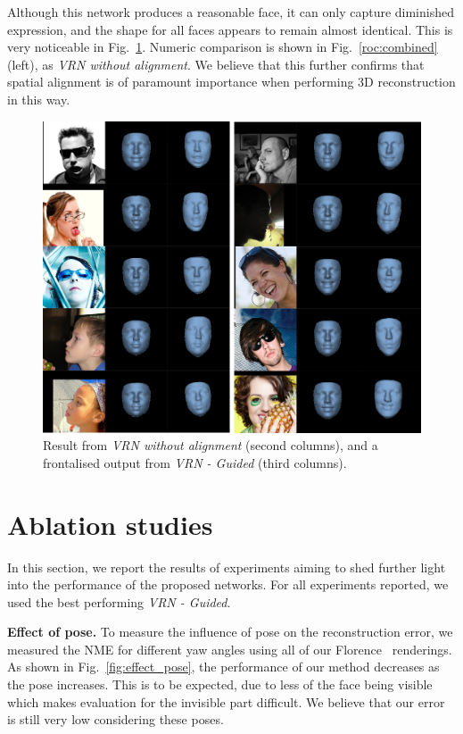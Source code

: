   Although this network produces a reasonable face, it can only capture diminished expression, and
  the shape for all faces appears to remain almost identical. This is very noticeable in Fig.~\ref{fig:frontal_visual}. Numeric comparison is shown in Fig.~\ref{roc:combined} (left), as \textit{VRN without alignment}. We believe that this further confirms that spatial alignment is of paramount importance when performing 3D reconstruction in this way.




\begin{figure}
\includegraphics[width=\linewidth]{img/frontal.png}
\caption[Visual results when spatial alignment is ignored]{Result from
  \textit{VRN without alignment} (second columns), and a frontalised
  output from \textit{VRN - Guided} (third columns).}
  \label{fig:frontal_visual}
\end{figure}

\section{Ablation studies}

In this section, we report the results of experiments aiming to shed
further light into the performance of the proposed networks. For all
experiments reported, we used the best performing \textit{VRN -
  Guided}.

\textbf{Effect of pose.} To measure the influence
of pose on the reconstruction error, we measured the NME for different
yaw angles using all of our Florence~\cite{masi2d3dFaceData}
renderings. As shown in Fig.~\ref{fig:effect_pose}, the performance of
our method decreases as the pose increases. This is to be expected,
due to less of the face being visible which makes evaluation for the
invisible part difficult. We believe that our error is still very low
considering these
poses. %


